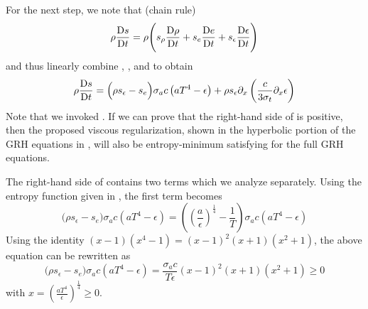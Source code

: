 \documentclass{mc2015}
\begin{document}
\noindent
For the next step, we note that (chain rule)
%
\begin{equation}
\rho \frac{\textrm{D} s}{\textrm{D} t} = \rho \Bigg( s_\rho \frac{\textrm{D} \rho}{\textrm{D} t} + s_e \frac{\textrm{D} e}{\textrm{D} t} +s_\epsilon \frac{\textrm{D} \epsilon}{\textrm{D} t} \Bigg)
\end{equation}
%
and thus linearly combine , , and  to obtain
%
\begin{equation} \label{eq:entro_eq_all_terms}
\rho \frac{\textrm{D} s}{\textrm{D} t} = \Big( \rho s_\epsilon -s_e \Big)  \sigma_a c \left( a T^4 - \epsilon \right) +   \rho s_\epsilon \partial_x \left( \frac{c}{3 \sigma_t} \partial_x \epsilon \right) 
\end{equation}
%
Note that we invoked .
If we can prove that the right-hand side of  is positive, then the proposed viscous regularization, shown in the hyperbolic portion of the GRH equations in , will
also be entropy-minimum satisfying for the full GRH equations. 

The right-hand side of  contains two terms which we analyze separately. Using the entropy function given in , the first term becomes
\begin{equation} 
\Big( \rho s_\epsilon -s_e \Big)  \sigma_a c \left( a T^4 - \epsilon \right) 
= \left( \left( \frac{a}{\epsilon}\right)^\frac{1}{4} - \frac{1}{T} \right)   \sigma_a c \left( a T^4 - \epsilon \right) 
\end{equation}
Using the identity $(x-1)(x^4-1) = (x-1)^2(x+1)(x^2+1)$, the above equation can be rewritten as
\begin{equation} 
\Big( \rho s_\epsilon -s_e \Big)  \sigma_a c \left( a T^4 - \epsilon \right) 
= \frac{\sigma_a c}{T \epsilon}  (x-1)^2(x+1)(x^2+1) \geq 0
\end{equation}
with $x=  \left(\frac{aT^4}{\epsilon}\right)^\frac{1}{4} \geq 0.$
\end{document}
